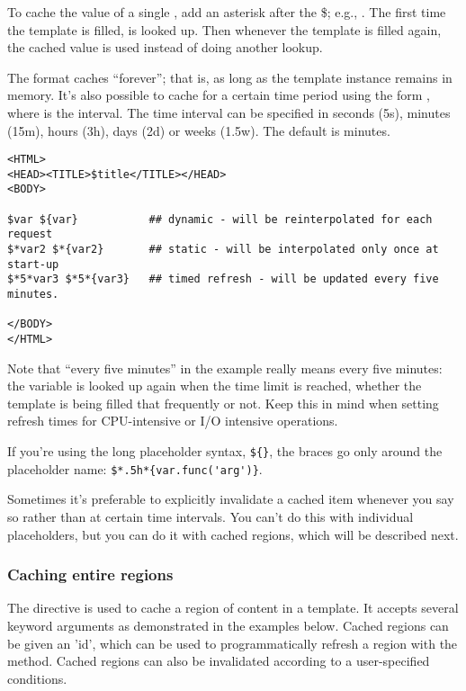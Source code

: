 To cache the value of a single , add an asterisk after the
\$; e.g.,  .  The first time the template is
filled,  is looked up.  Then whenever the template is filled again,
the cached value is used instead of doing another lookup.  

The \code{\$*} format caches ``forever''; that is, as long as the template
instance remains in memory.  It's also possible to cache for a certain time
period using the form , where  is
the interval.  The time interval can be specified in seconds (5s), minutes
(15m), hours (3h), days (2d) or weeks (1.5w). The default is minutes.

\begin{verbatim}
<HTML>
<HEAD><TITLE>$title</TITLE></HEAD>
<BODY>

$var ${var}           ## dynamic - will be reinterpolated for each request
$*var2 $*{var2}       ## static - will be interpolated only once at start-up
$*5*var3 $*5*{var3}   ## timed refresh - will be updated every five minutes.

</BODY>
</HTML>
\end{verbatim}

Note that ``every five minutes'' in the example really means every five
minutes: the variable is looked up again when the time limit is reached,
whether the template is being filled that frequently or not.  Keep this in
mind when setting refresh times for CPU-intensive or I/O intensive 
operations.

If you're using the long placeholder syntax, \verb+${}+, the braces go only
around the placeholder name: \verb+$*.5h*{var.func('arg')}+.

Sometimes it's preferable to explicitly invalidate a cached item whenever
you say so rather than at certain time intervals.  You can't do this with
individual placeholders, but you can do it with cached regions, which will
be described next.

\subsubsection{Caching entire regions}
\label{output.caching.regions}

The  directive is used to cache a region of
content in a template.  It accepts several keyword arguments as demonstrated in
the examples below.  Cached regions can be given an 'id', which can be used to
programmatically refresh a region with the 
method.  Cached regions can also be invalidated according to a user-specified
 conditions.

